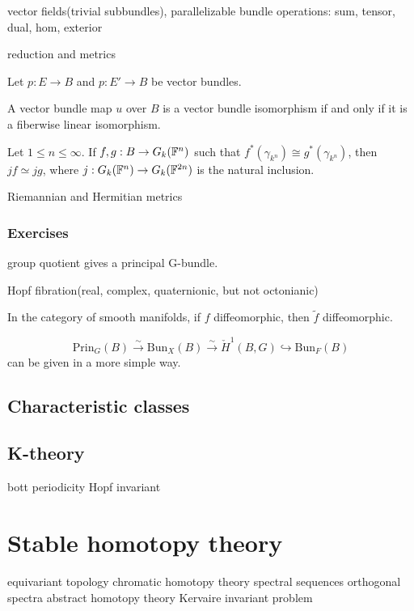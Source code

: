 \documentclass{../../large}
\begin{document}
vector fields(trivial subbundles), parallelizable
bundle operations: sum, tensor, dual, hom, exterior

reduction and metrics

\begin{prb}
Let $p:E\to B$ and $p:E'\to B$ be vector bundles.
\begin{parts}
\item A vector bundle map $u$ over $B$ is a vector bundle isomorphism if and only if it is a fiberwise linear isomorphism.
\end{parts}
\end{prb}



Let $1\le n\le\infty$.
If $f,g:B\to G_k(\mathbb{F}^n)$ such that $f^*(\gamma_{k^n})\cong g^*(\gamma_{k^n})$, then $jf\simeq jg$, where $j:G_k(\mathbb{F}^n)\to G_k(\mathbb{F}^{2n})$ is the natural inclusion.


\begin{prb}
Riemannian and Hermitian metrics
\end{prb}

\section*{Exercises}

group quotient gives a principal G-bundle.

Hopf fibration(real, complex, quaternionic, but not octonianic)

In the category of smooth manifolds, if $f$ diffeomorphic, then $\tilde f$ diffeomorphic.


\begin{prb}

\[\mathrm{Prin}_G(B)\xrightarrow{\sim}\mathrm{Bun}_X(B)\xrightarrow{\sim}\check H^1(B,G)\hookrightarrow\mathrm{Bun}_F(B)\]
can be given in a more simple way.

\end{prb}




\chapter{Characteristic classes}


\chapter{K-theory}

bott periodicity
Hopf invariant





\part{Stable homotopy theory}
equivariant topology
chromatic homotopy theory
spectral sequences
orthogonal spectra
abstract homotopy theory
Kervaire invariant problem
\end{document}
